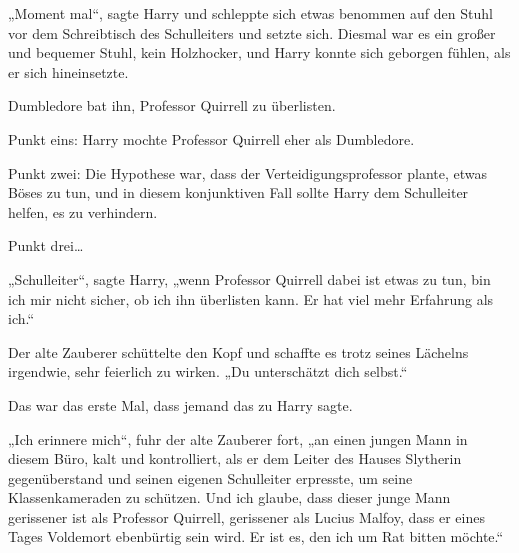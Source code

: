 „Moment mal“, sagte Harry und schleppte sich etwas benommen auf den Stuhl vor dem Schreibtisch des Schulleiters und setzte sich. Diesmal war es ein großer und bequemer Stuhl, kein Holzhocker, und Harry konnte sich geborgen fühlen, als er sich hineinsetzte.

Dumbledore bat ihn, Professor Quirrell zu überlisten.

Punkt eins: Harry mochte Professor Quirrell eher als Dumbledore.

Punkt zwei: Die Hypothese war, dass der Verteidigungsprofessor plante, etwas Böses zu tun, und in diesem konjunktiven Fall sollte Harry dem Schulleiter helfen, es zu verhindern.

Punkt drei…

„Schulleiter“, sagte Harry, „wenn Professor Quirrell dabei ist etwas zu tun, bin ich mir nicht sicher, ob ich ihn überlisten kann. Er hat viel mehr Erfahrung als ich.“

Der alte Zauberer schüttelte den Kopf und schaffte es trotz seines Lächelns irgendwie, sehr feierlich zu wirken. „Du unterschätzt dich selbst.“

Das war das erste Mal, dass jemand das zu Harry sagte.

„Ich erinnere mich“, fuhr der alte Zauberer fort, „an einen jungen Mann in diesem Büro, kalt und kontrolliert, als er dem Leiter des Hauses Slytherin gegenüberstand und seinen eigenen Schulleiter erpresste, um seine Klassenkameraden zu schützen. Und ich glaube, dass dieser junge Mann gerissener ist als Professor Quirrell, gerissener als Lucius Malfoy, dass er eines Tages Voldemort ebenbürtig sein wird. Er ist es, den ich um Rat bitten möchte.“

